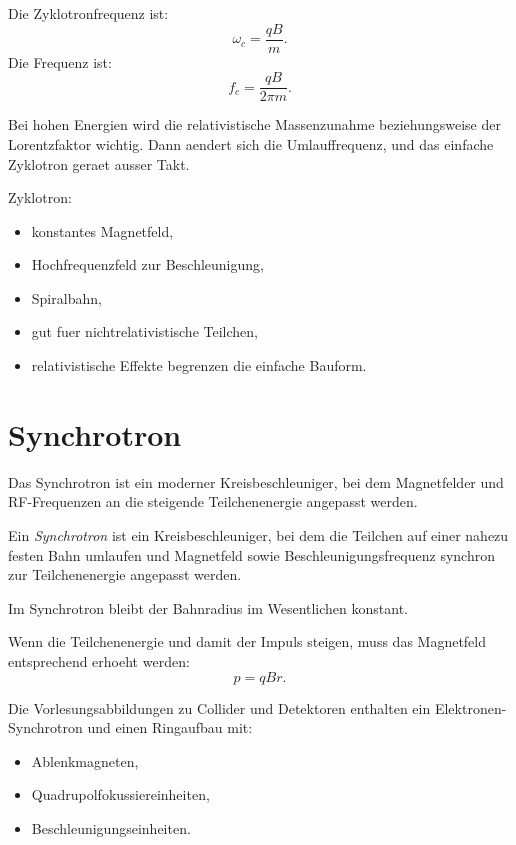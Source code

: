 \begin{formulabox}
Die Zyklotronfrequenz ist:
\[
    \omega_c = \frac{qB}{m}.
\]
Die Frequenz ist:
\[
    f_c = \frac{qB}{2\pi m}.
\]
\end{formulabox}

\begin{conceptbox}
Bei hohen Energien wird die relativistische Massenzunahme beziehungsweise der
Lorentzfaktor wichtig.
Dann aendert sich die Umlauffrequenz, und das einfache Zyklotron geraet ausser Takt.
\end{conceptbox}

\begin{examtipbox}
Zyklotron:
\begin{itemize}
    \item konstantes Magnetfeld,
    \item Hochfrequenzfeld zur Beschleunigung,
    \item Spiralbahn,
    \item gut fuer nichtrelativistische Teilchen,
    \item relativistische Effekte begrenzen die einfache Bauform.
\end{itemize}
\end{examtipbox}

\section{Synchrotron}

Das Synchrotron ist ein moderner Kreisbeschleuniger, bei dem Magnetfelder und
RF-Frequenzen an die steigende Teilchenenergie angepasst werden.

\begin{definitionbox}
Ein \emph{Synchrotron} ist ein Kreisbeschleuniger, bei dem die Teilchen auf einer
nahezu festen Bahn umlaufen und Magnetfeld sowie Beschleunigungsfrequenz synchron
zur Teilchenenergie angepasst werden.
\end{definitionbox}

\begin{conceptbox}
Im Synchrotron bleibt der Bahnradius im Wesentlichen konstant.

Wenn die Teilchenenergie und damit der Impuls steigen, muss das Magnetfeld entsprechend
erhoeht werden:
\[
    p=qBr.
\]
\end{conceptbox}

\begin{notebox}
Die Vorlesungsabbildungen zu Collider und Detektoren enthalten ein Elektronen-Synchrotron
und einen Ringaufbau mit:
\begin{itemize}
    \item Ablenkmagneten,
    \item Quadrupolfokussiereinheiten,
    \item Beschleunigungseinheiten.
\end{itemize}
\end{notebox}

